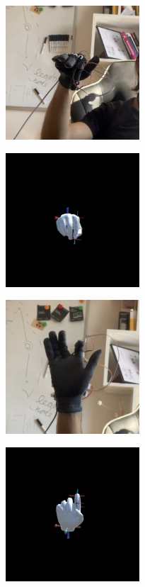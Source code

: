 \begin{figure}
 \centering
 \begin{subfigure}[ht]{0.3\textwidth}
     \centering
     \includegraphics[width=5cm,height=5cm]{immagini/confronto/3_real.jpg}
     \caption{}
 \end{subfigure}
 \begin{subfigure}[ht]{0.3\textwidth}
     \includegraphics[width=5cm,height=5cm]{immagini/confronto/3_sym.jpg}
     \caption{}
 \end{subfigure}
 \caption{}
\end{figure}

\begin{figure}
 \centering
 \begin{subfigure}[ht]{0.3\textwidth}
     \centering
     \includegraphics[width=5cm,height=5cm]{immagini/confronto/4_real.jpg}
     \caption{}
 \end{subfigure}
 \begin{subfigure}[ht]{0.3\textwidth}
     \includegraphics[width=5cm,height=5cm]{immagini/confronto/4_sym.jpg}
     \caption{}
 \end{subfigure}
 \caption{}
\end{figure}

